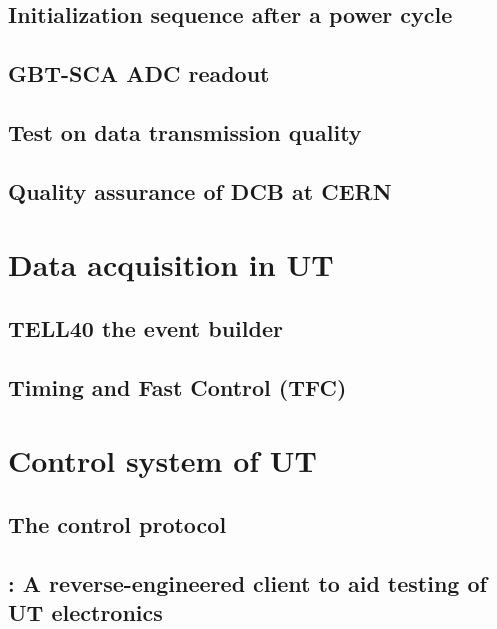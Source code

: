 \subsection{Initialization sequence after a power cycle}
\label{dcb-init}


\subsection{GBT-SCA ADC readout}
\label{dcb-sca}


\subsection{Test on data transmission quality}
\label{dcb-test-data}


\subsection{Quality assurance of DCB at CERN}
\label{dcb-qa}


\section{Data acquisition in UT}
\label{ref:ut:daq}


\subsection{TELL40 the event builder}


\subsection{Timing and Fast Control (TFC)}


\section{Control system of UT}
\label{ref:ut:ctrl}


\subsection{The \dim control protocol}


\subsection{\nanoDAQ: A reverse-engineered \dim client to aid testing of UT electronics}
